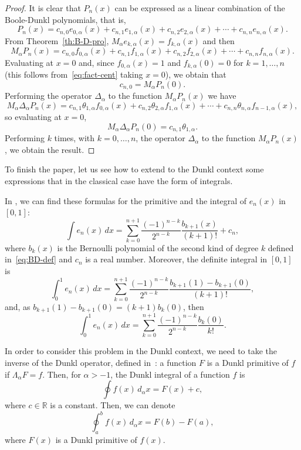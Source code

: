 \documentclass[11pt]{article}
\theoremstyle{plain}
\theoremstyle{remark}
\numberwithin{equation}{section} %
\newcommand{\La}{\Lambda_{\alpha}}
\newcommand{\RR}{\mathbb{R}}
\begin{document}
\begin{proof}
It is clear that $P_n(x)$ can be expressed as a linear combination of the Boole-Dunkl polynomials, that is,
\[
  P_n(x) = c_{n,0}e_{0,\alpha}(x) + c_{n,1}e_{1,\alpha}(x) + c_{n,2}e_{2,\alpha}(x)
  + \cdots + c_{n,n}e_{n,\alpha}(x).
\]
From Theorem~\ref{th:B-D-pro}, $M_{\alpha}e_{k,\alpha}(x) = f_{k,\alpha}(x)$ and then
\[
  M_{\alpha}P_n(x) = c_{n,0}f_{0,\alpha}(x) + c_{n,1}f_{1,\alpha}(x)
  + c_{n,2}f_{2,\alpha}(x) + \cdots + c_{n,n}f_{n,\alpha}(x).
\]
Evaluating at $x=0$ and, since $f_{0,\alpha}(x)=1$ and $f_{k,\alpha}(0)=0$ for $k=1,\ldots,n$ (this follows from~\eqref{eq:fact-cent} taking $x=0$), we obtain that
\[
  c_{n,0} = M_{\alpha}P_n(0).
\]
Performing the operator $\Delta_{\alpha}$ to the function $M_{\alpha}P_n(x)$ we have
\[
  M_{\alpha}\Delta_{\alpha}P_n(x)
  = c_{n,1}\theta_{1,\alpha}f_{0,\alpha}(x) + c_{n,2}\theta_{2,\alpha}f_{1,\alpha}(x)
  + \cdots + c_{n,n}\theta_{n,\alpha}f_{n-1,\alpha}(x),
\]
so evaluating at $x=0$,
\[
  M_{\alpha}\Delta_{\alpha}P_n(0) = c_{n,1}\theta_{1,\alpha}.
\]
Performing $k$ times, with $k=0,\ldots,n$, the operator $\Delta_{\alpha}$ to the function $M_{\alpha}P_n(x)$, we obtain the result.
\end{proof}

To finish the paper, let us see how to extend to the Dunkl context some expressions that in the classical case have the form of integrals.

In \cite[\S\,114]{Jor2}, we can find these formulas for the primitive and the integral of $e_{n}(x)$ in $[0,1]$:
\[
  \int e_n(x)\,dx = \sum_{k=0}^{n+1} \frac{(-1)^{n-k}}{2^{n-k}} \frac{b_{k+1}(x)}{(k+1)!} + c_n,
\]
where $b_k(x)$ is the Bernoulli polynomial of the second kind of degree $k$ defined in~\eqref{eq:BD-def} and $c_n$ is a real number. Moreover, the definite integral in $[0,1]$ is 
\[
  \int_0^{1} e_n(x)\,dx = \sum_{k=0}^{n+1} \frac{(-1)^{n-k}}{2^{n-k}} \frac{b_{k+1}(1)-b_{k+1}(0)}{(k+1)!},
\]
and, as $b_{k+1}(1)-b_{k+1}(0)=(k+1)b_k(0)$, then
\[
  \int_0^{1} e_n(x)\,dx = \sum_{k=0}^{n+1} \frac{(-1)^{n-k}}{2^{n-k}}\frac{b_{k}(0)}{k!}.
\]

In order to consider this problem in the Dunkl context, we need to take the inverse of the Dunkl operator, defined in~\cite{CMV}: a function $F$ is a Dunkl primitive of $f$ if $\La F=f$. Then, for $\alpha>-1$, the Dunkl integral of a function $f$ is 
\[
  \oint f(x)\,d_\alpha x = F(x) + c,
\]
where $c \in \RR$ is a constant. Then, we can denote 
\[
  \oint_a^b f(x)\,d_\alpha x = F(b)-F(a),
\]
where $F(x)$ is a Dunkl primitive of $f(x)$.
\end{document}
